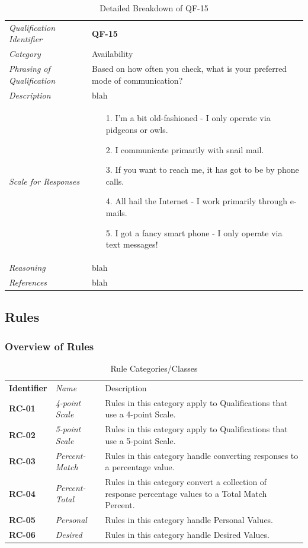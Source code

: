 \documentclass[12pt,letterpaper]{article}
\begin{document}
\begin{table}[H]
	\caption{Detailed Breakdown of QF-15}
	\begin{tabu} to 
		\toprule
		Qualification Identifier & {\bf QF-15}\\
		Category & Availability \\
		Phrasing of Qualification & Based on how often you check, what is your preferred mode of communication? \\
		Description & blah\\
		Scale for Responses &
		\begin{minipage}[t]{\linewidth}
			\begin{enumerate}
				\item[1.] I'm a bit old-fashioned - I only operate via pidgeons or owls.
				\item[2.] I communicate primarily with snail mail.
				\item[3.] If you want to reach me, it has got to be by phone calls.
				\item[4.] All hail the Internet - I work primarily through e-mails.
				\item[5.] I got a fancy smart phone - I only operate via text messages!
			\end{enumerate}
		\end{minipage}\\
		Reasoning & blah\\
		References & blah\\
		\toprule
	\end{tabu}
\end{table}

\subsection{Rules}
\subsubsection{Overview of Rules}

\begin{table}[H]
	\caption{Rule Categories/Classes}
	\begin{tabu} to 
	    \tableheader{}Identifier & Name & Description\\
		RC-01 & 4-point Scale & Rules in this category apply to Qualifications that use a 4-point Scale.\\
		RC-02 & 5-point Scale & Rules in this category apply to Qualifications that use a 5-point Scale.\\
		RC-03 & Percent-Match & Rules in this category handle converting responses to a percentage value.\\
		RC-04 & Percent-Total & Rules in this category convert a collection of response percentage values to a Total Match Percent.\\
		RC-05 & Personal & Rules in this category handle Personal Values. \\
		RC-06 & Desired & Rules in this category handle Desired Values.\\
	\end{tabu}
\end{table}
\end{document}
